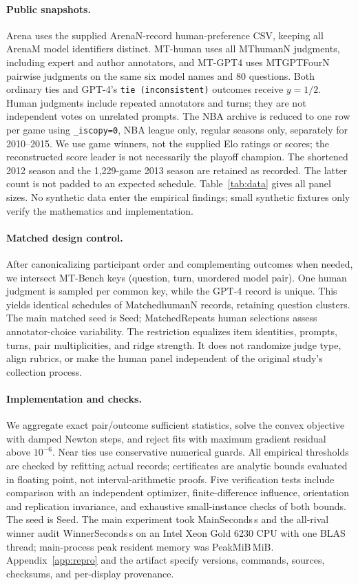\documentclass{article}
\newcommand{\num}[1]{\csname #1\endcsname}
\begin{document}
\paragraph{Public snapshots.}
Arena uses the supplied \num{ArenaN}-record human-preference CSV, keeping all \num{ArenaM} model identifiers distinct. MT-human uses all \num{MThumanN} judgments, including expert and author annotators, and MT-GPT4 uses \num{MTGPTFourN} pairwise judgments on the same six model names and 80 questions. Both ordinary ties and GPT-4's \texttt{tie (inconsistent)} outcomes receive $y=1/2$. Human judgments include repeated annotators and turns; they are not independent votes on unrelated prompts. The NBA archive \citep{fivethirtyeight2015nba} is reduced to one row per game using \texttt{\_iscopy=0}, NBA league only, regular seasons only, separately for 2010--2015. We use game winners, not the supplied Elo ratings or scores; the reconstructed score leader is not necessarily the playoff champion. The shortened 2012 season and the 1,229-game 2013 season are retained as recorded. The latter count is not padded to an expected schedule. Table~\ref{tab:data} gives all panel sizes. No synthetic data enter the empirical findings; small synthetic fixtures only verify the mathematics and implementation.

\paragraph{Matched design control.}
After canonicalizing participant order and complementing outcomes when needed, we intersect MT-Bench keys (question, turn, unordered model pair). One human judgment is sampled per common key, while the GPT-4 record is unique. This yields identical schedules of \num{MatchedhumanN} records, retaining question clusters. The main matched seed is \num{Seed}; \num{MatchedRepeats} human selections assess annotator-choice variability. The restriction equalizes item identities, prompts, turns, pair multiplicities, and ridge strength. It does not randomize judge type, align rubrics, or make the human panel independent of the original study's collection process.

\paragraph{Implementation and checks.}
We aggregate exact pair/outcome sufficient statistics, solve the convex objective with damped Newton steps, and reject fits with maximum gradient residual above $10^{-6}$. Near ties use conservative numerical guards. All empirical thresholds are checked by refitting actual records; certificates are analytic bounds evaluated in floating point, not interval-arithmetic proofs. Five verification tests include comparison with an independent optimizer, finite-difference influence, orientation and replication invariance, and exhaustive small-instance checks of both bounds. The seed is \num{Seed}. The main experiment took \num{MainSeconds}\,s and the all-rival winner audit \num{WinnerSeconds}\,s on an Intel Xeon Gold 6230 CPU with one BLAS thread; main-process peak resident memory was \num{PeakMiB}\,MiB. Appendix~\ref{app:repro} and the artifact specify versions, commands, sources, checksums, and per-display provenance.
\end{document}
